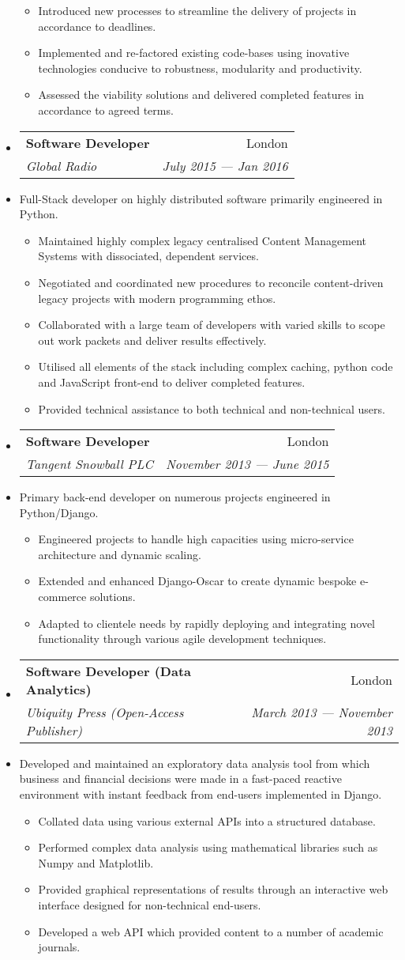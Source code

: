 \documentclass[letterpaper,11pt]{article}
\makeatletter
\newcommand{\resitem}[1]{\item #1 \vspace{-2pt}}
\newcommand{\ressubheading}[4]{
		\begin{tabular*}{180mm}{l@{\extracolsep{\fill}}r}
			\textbf{#1} & #2 \\
			\textit{#3} & \textit{#4} \\
		\end{tabular*}\vspace{-6pt}
	}
\newcommand{\resdescription}[1]{#1 \vspace{-0mm}}
\makeatother
\begin{document}
\begin{itemize}
\begin{itemize}
					\resitem{Introduced new processes to streamline the delivery of projects in accordance to deadlines.}
					\resitem{Implemented and re-factored existing code-bases using inovative technologies conducive to robustness, modularity and productivity.}
					\resitem{Assessed the viability solutions and delivered completed features in accordance to agreed terms.}
			\end{itemize}
		\item[]
			\ressubheading{Software Developer}{London}{Global Radio}{July 2015 --- Jan 2016}
		\item[]
			\resdescription{Full-Stack developer on highly distributed software primarily engineered in Python.}
			\begin{itemize}
					\resitem{Maintained highly complex legacy centralised Content Management Systems with dissociated, dependent services.}
					\resitem{Negotiated and coordinated new procedures to reconcile content-driven legacy projects with modern programming ethos.}
					\resitem{Collaborated with a large team of developers with varied skills to scope out work packets and deliver results effectively.}
					\resitem{Utilised all elements of the stack including complex caching, python code and JavaScript front-end to deliver completed features.}
					\resitem{Provided technical assistance to both technical and non-technical users.}
			\end{itemize}


		\item[]
			\ressubheading{Software Developer}{London}{Tangent Snowball PLC}{November 2013 --- June 2015}
		\item[]
			\resdescription{Primary back-end developer on numerous projects engineered in Python/Django.}
			\begin{itemize}
					\resitem{Engineered projects to handle high capacities using micro-service architecture and dynamic scaling.}
					\resitem{Extended and enhanced Django-Oscar to create dynamic bespoke e-commerce solutions.}
					\resitem{Adapted to clientele needs by rapidly deploying and integrating novel functionality through various agile development techniques.}
			\end{itemize}

		\item[]
			\ressubheading{Software Developer (Data Analytics)}{London}{Ubiquity Press (Open-Access Publisher)}{March 2013 --- November 2013}
		\item[]
			\resdescription{Developed and maintained an exploratory data analysis tool from which business and financial decisions were made in a fast-paced reactive environment with instant feedback from end-users implemented in Django. }
			\begin{itemize}
					\resitem{Collated data using various external APIs into a structured database.}
					\resitem{Performed complex data analysis using mathematical libraries such as Numpy and Matplotlib.}
					\resitem{Provided graphical representations of results through an interactive web interface designed for non-technical end-users.}
					\resitem{Developed a web API which provided content to a number of academic journals.}
			\end{itemize}


\end{itemize}
\end{document}
